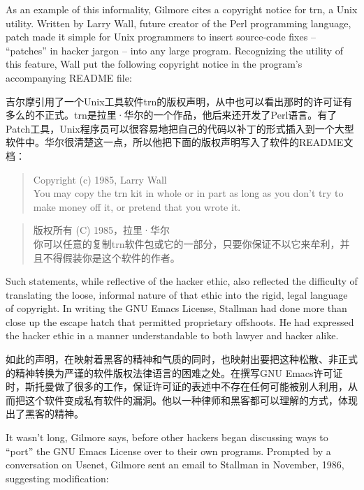 \ifdefined\eng
As an example of this informality, Gilmore cites a copyright notice for trn, a Unix utility. Written by Larry Wall, future creator of the Perl programming language, patch made it simple for Unix programmers to insert source-code fixes -- ``patches'' in hacker jargon -- into any large program. Recognizing the utility of this feature, Wall put the following copyright notice in the program's accompanying README file:
\fi

\ifdefined\chs
吉尔摩引用了一个Unix工具软件trn的版权声明，从中也可以看出那时的许可证有多么的不正式。trn是拉里·华尔的一个作品，他后来还开发了Perl语言。有了Patch工具，Unix程序员可以很容易地把自己的代码以补丁的形式插入到一个大型软件中。华尔很清楚这一点，所以他把下面的版权声明写入了软件的README文档：
\fi

\ifdefined\eng
\begin{quote}
Copyright (c) 1985, Larry Wall\\
You may copy the trn kit in whole or in part as long as you don't try to make money off it, or pretend that you wrote it.
\end{quote}
\fi

\ifdefined\chs
\begin{quote}
版权所有 (C) 1985，拉里·华尔\\
你可以任意的复制trn软件包或它的一部分，只要你保证不以它来牟利，并且不得假装你是这个软件的作者。
\end{quote}
\fi

\ifdefined\eng
Such statements, while reflective of the hacker ethic, also reflected the difficulty of translating the loose, informal nature of that ethic into the rigid, legal language of copyright. In writing the GNU Emacs License, Stallman had done more than close up the escape hatch that permitted proprietary offshoots. He had expressed the hacker ethic in a manner understandable to both lawyer and hacker alike.
\fi

\ifdefined\chs
如此的声明，在映射着黑客的精神和气质的同时，也映射出要把这种松散、非正式的精神转换为严谨的软件版权法律语言的困难之处。在撰写GNU Emacs许可证时，斯托曼做了很多的工作，保证许可证的表述中不存在任何可能被别人利用，从而把这个软件变成私有软件的漏洞。他以一种律师和黑客都可以理解的方式，体现出了黑客的精神。
\fi

\ifdefined\eng
It wasn't long, Gilmore says, before other hackers began discussing ways to ``port'' the GNU Emacs License over to their own programs. Prompted by a conversation on Usenet, Gilmore sent an email to Stallman in November, 1986, suggesting modification:
\fi


